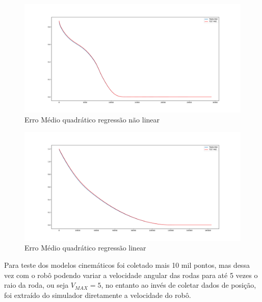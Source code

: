 \begin{figure}[H]
    \label{fig:error:quadratico:nao:linear}
    \centering
    \includegraphics[scale=0.3]{figuras/MSE_error_non_linear.pdf}
    \caption{Erro Médio quadrático regressão não linear}
\end{figure}

\begin{figure}[H]
    \label{fig:error:quadratico:linear}
    \centering
    \includegraphics[scale=0.3]{figuras/mse_error_linear.pdf}
    \caption{Erro Médio quadrático regressão linear}
\end{figure}

Para teste dos modelos cinemáticos foi coletado mais 10 mil pontos,
mas dessa vez com o robô podendo variar a velocidade angular das rodas
para até 5 vezes o raio da roda, ou seja $V_{MAX}=5$, no entanto ao invés
de coletar dados de posição, foi extraído do simulador diretamente a
velocidade do robô.

